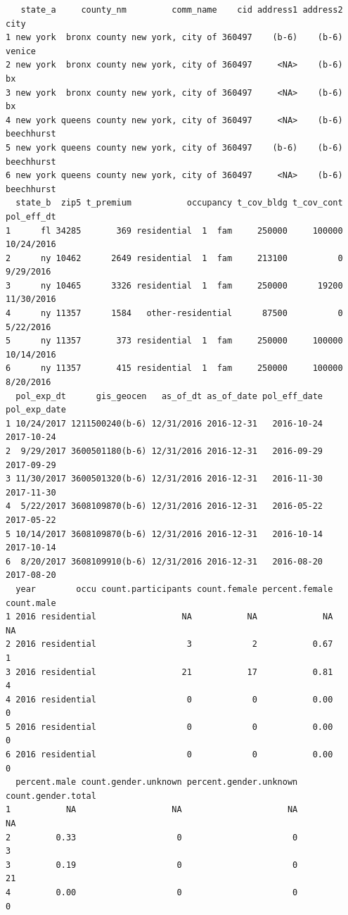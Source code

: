 \documentclass[
  letterpaper,
  DIV=11,
  numbers=noendperiod]{scrartcl}
\begin{document}
\begin{verbatim}
   state_a     county_nm         comm_name    cid address1 address2       city
1 new york  bronx county new york, city of 360497    (b-6)    (b-6)     venice
2 new york  bronx county new york, city of 360497     <NA>    (b-6)         bx
3 new york  bronx county new york, city of 360497     <NA>    (b-6)         bx
4 new york queens county new york, city of 360497     <NA>    (b-6) beechhurst
5 new york queens county new york, city of 360497    (b-6)    (b-6) beechhurst
6 new york queens county new york, city of 360497     <NA>    (b-6) beechhurst
  state_b  zip5 t_premium           occupancy t_cov_bldg t_cov_cont pol_eff_dt
1      fl 34285       369 residential  1  fam     250000     100000 10/24/2016
2      ny 10462      2649 residential  1  fam     213100          0  9/29/2016
3      ny 10465      3326 residential  1  fam     250000      19200 11/30/2016
4      ny 11357      1584   other-residential      87500          0  5/22/2016
5      ny 11357       373 residential  1  fam     250000     100000 10/14/2016
6      ny 11357       415 residential  1  fam     250000     100000  8/20/2016
  pol_exp_dt      gis_geocen   as_of_dt as_of_date pol_eff_date pol_exp_date
1 10/24/2017 1211500240(b-6) 12/31/2016 2016-12-31   2016-10-24   2017-10-24
2  9/29/2017 3600501180(b-6) 12/31/2016 2016-12-31   2016-09-29   2017-09-29
3 11/30/2017 3600501320(b-6) 12/31/2016 2016-12-31   2016-11-30   2017-11-30
4  5/22/2017 3608109870(b-6) 12/31/2016 2016-12-31   2016-05-22   2017-05-22
5 10/14/2017 3608109870(b-6) 12/31/2016 2016-12-31   2016-10-14   2017-10-14
6  8/20/2017 3608109910(b-6) 12/31/2016 2016-12-31   2016-08-20   2017-08-20
  year        occu count.participants count.female percent.female count.male
1 2016 residential                 NA           NA             NA         NA
2 2016 residential                  3            2           0.67          1
3 2016 residential                 21           17           0.81          4
4 2016 residential                  0            0           0.00          0
5 2016 residential                  0            0           0.00          0
6 2016 residential                  0            0           0.00          0
  percent.male count.gender.unknown percent.gender.unknown count.gender.total
1           NA                   NA                     NA                 NA
2         0.33                    0                      0                  3
3         0.19                    0                      0                 21
4         0.00                    0                      0                  0

\end{verbatim}
\end{document}
